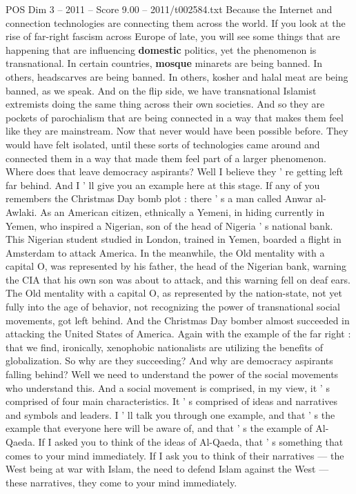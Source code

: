 \begin{textsample}{POS Dim 3 – 2011 – Score 9.00 – 2011/t002584.txt}
Because the Internet and connection technologies are connecting them across the world.
If you look at the rise of far-right fascism across Europe of late, you will see some things that are happening that are influencing \textbf{domestic} politics, yet the phenomenon is transnational.
In certain countries, \textbf{mosque} minarets are being banned.
In others, headscarves are being banned.
In others, kosher and halal meat are being banned, as we speak.
And on the flip side, we have transnational Islamist extremists doing the same thing across their own societies.
And so they are pockets of parochialism that are being connected in a way that makes them feel like they are mainstream.
Now that never would have been possible before.
They would have felt isolated, until these sorts of technologies came around and connected them in a way that made them feel part of a larger phenomenon.
Where does that leave democracy aspirants?
Well I believe they ' re getting left far behind.
And I ' ll give you an example here at this stage.
If any of you remembers the Christmas Day bomb plot : there ' s a man called Anwar al-Awlaki.
As an American citizen, ethnically a Yemeni, in hiding currently in Yemen, who inspired a Nigerian, son of the head of Nigeria ' s national bank.
This Nigerian student studied in London, trained in Yemen, boarded a flight in Amsterdam to attack America.
In the meanwhile, the Old mentality with a capital O, was represented by his father, the head of the Nigerian bank, warning the CIA that his own son was about to attack, and this warning fell on deaf ears.
The Old mentality with a capital O, as represented by the nation-state, not yet fully into the age of behavior, not recognizing the power of transnational social movements, got left behind.
And the Christmas Day bomber almost succeeded in attacking the United States of America.
Again with the example of the far right : that we find, ironically, xenophobic nationalists are utilizing the benefits of globalization.
So why are they succeeding?
And why are democracy aspirants falling behind?
Well we need to understand the power of the social movements who understand this.
And a social movement is comprised, in my view, it ' s comprised of four main characteristics.
It ' s comprised of ideas and narratives and symbols and leaders.
I ' ll talk you through one example, and that ' s the example that everyone here will be aware of, and that ' s the example of Al-Qaeda.
If I asked you to think of the ideas of Al-Qaeda, that ' s something that comes to your mind immediately.
If I ask you to think of their narratives — the West being at war with Islam, the need to defend Islam against the West — these narratives, they come to your mind immediately.

\end{textsample}
